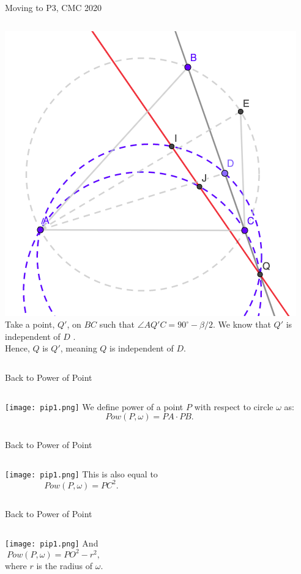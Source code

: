 \documentclass{beamer}
\begin{document}
\begin{frame}{Moving to P3, CMC 2020}
	\begin{columns}
		\includegraphics[scale=0.34]{spi11.png}
		Take a point, $Q'$, on $BC$ such that $\angle AQ'C = 
		90^\circ - \beta/2$. We know that $Q'$ is independent of $D$
		.\\
		Hence, $Q$ is $Q'$, meaning $Q$ is independent of $D$.
	\end{columns}
\end{frame}

\begin{frame}{Back to Power of Point}
	\begin{columns}
		\column{0.6\textwidth}
		\texttt{[image: pip1.png]}
		\column{0.4\textwidth}
		We define power of a point $P$ with respect to circle
		$\omega$ as:
		\[
			Pow(P, \omega) = PA\cdot PB
		.\] 
	\end{columns}
\end{frame}
\begin{frame}{Back to Power of Point}
	\begin{columns}
		\texttt{[image: pip1.png]}
		This is also equal to
		\[
			Pow(P, \omega) = PC^2
		.\] 
	\end{columns}
\end{frame}
\begin{frame}{Back to Power of Point}
	\begin{columns}
		\column{0.6\textwidth}
		\texttt{[image: pip1.png]}
		\column{0.4\textwidth}
		And
		\[
			Pow(P, \omega) = PO^2 - r^2
		,\] where $r$ is the radius of $\omega$.
	\end{columns}
\end{frame}
\end{document}
